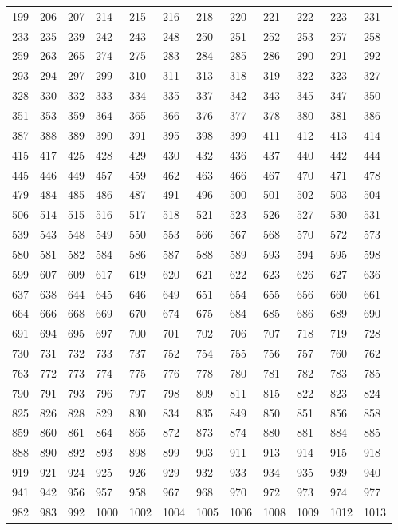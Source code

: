 \begin{longtable}{llllllllllll}
199& 206& 207& 214& 215& 216& 218& 220& 221& 222& 223& 231\\
233& 235& 239& 242& 243& 248& 250& 251& 252& 253& 257& 258\\
259& 263& 265& 274& 275& 283& 284& 285& 286& 290& 291& 292\\
293& 294& 297& 299& 310& 311& 313& 318& 319& 322& 323& 327\\
328& 330& 332& 333& 334& 335& 337& 342& 343& 345& 347& 350\\
351& 353& 359& 364& 365& 366& 376& 377& 378& 380& 381& 386\\
387& 388& 389& 390& 391& 395& 398& 399& 411& 412& 413& 414\\
415& 417& 425& 428& 429& 430& 432& 436& 437& 440& 442& 444\\
445& 446& 449& 457& 459& 462& 463& 466& 467& 470& 471& 478\\
479& 484& 485& 486& 487& 491& 496& 500& 501& 502& 503& 504\\
506& 514& 515& 516& 517& 518& 521& 523& 526& 527& 530& 531\\
539& 543& 548& 549& 550& 553& 566& 567& 568& 570& 572& 573\\
580& 581& 582& 584& 586& 587& 588& 589& 593& 594& 595& 598\\
599& 607& 609& 617& 619& 620& 621& 622& 623& 626& 627& 636\\
637& 638& 644& 645& 646& 649& 651& 654& 655& 656& 660& 661\\
664& 666& 668& 669& 670& 674& 675& 684& 685& 686& 689& 690\\
691& 694& 695& 697& 700& 701& 702& 706& 707& 718& 719& 728\\
730& 731& 732& 733& 737& 752& 754& 755& 756& 757& 760& 762\\
763& 772& 773& 774& 775& 776& 778& 780& 781& 782& 783& 785\\
790& 791& 793& 796& 797& 798& 809& 811& 815& 822& 823& 824\\
825& 826& 828& 829& 830& 834& 835& 849& 850& 851& 856& 858\\
859& 860& 861& 864& 865& 872& 873& 874& 880& 881& 884& 885\\
888& 890& 892& 893& 898& 899& 903& 911& 913& 914& 915& 918\\
919& 921& 924& 925& 926& 929& 932& 933& 934& 935& 939& 940\\
941& 942& 956& 957& 958& 967& 968& 970& 972& 973& 974& 977\\
982& 983& 992& 1000& 1002& 1004& 1005& 1006& 1008& 1009& 1012& 1013\\

\end{longtable}
